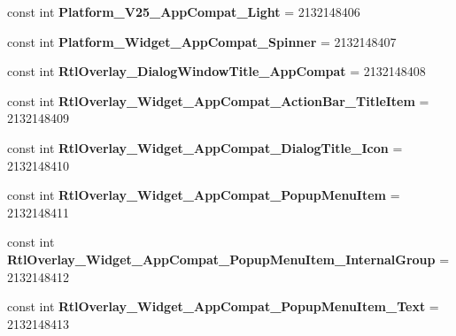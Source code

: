 \begin{DoxyCompactItemize}
const int {\bfseries Platform\+\_\+\+V25\+\_\+\+App\+Compat\+\_\+\+Light} = 2132148406
\item 
\mbox{\label{classst_delivery_1_1_resource_1_1_style_a5e16dbc8e26e392588f603287a7cfe24}} 
const int {\bfseries Platform\+\_\+\+Widget\+\_\+\+App\+Compat\+\_\+\+Spinner} = 2132148407
\item 
\mbox{\label{classst_delivery_1_1_resource_1_1_style_ae424e442f189c7aafae8f89eb0df77f6}} 
const int {\bfseries Rtl\+Overlay\+\_\+\+Dialog\+Window\+Title\+\_\+\+App\+Compat} = 2132148408
\item 
\mbox{\label{classst_delivery_1_1_resource_1_1_style_aab93a183f255bb31fed33515a840aed0}} 
const int {\bfseries Rtl\+Overlay\+\_\+\+Widget\+\_\+\+App\+Compat\+\_\+\+Action\+Bar\+\_\+\+Title\+Item} = 2132148409
\item 
\mbox{\label{classst_delivery_1_1_resource_1_1_style_ada602b0e60651a4bb10f8c519db69cd1}} 
const int {\bfseries Rtl\+Overlay\+\_\+\+Widget\+\_\+\+App\+Compat\+\_\+\+Dialog\+Title\+\_\+\+Icon} = 2132148410
\item 
\mbox{\label{classst_delivery_1_1_resource_1_1_style_ac3f228405fed77d8285d5f7f7c8c7120}} 
const int {\bfseries Rtl\+Overlay\+\_\+\+Widget\+\_\+\+App\+Compat\+\_\+\+Popup\+Menu\+Item} = 2132148411
\item 
\mbox{\label{classst_delivery_1_1_resource_1_1_style_a9027c21ef5e8007a18578a2be1c8a4b5}} 
const int {\bfseries Rtl\+Overlay\+\_\+\+Widget\+\_\+\+App\+Compat\+\_\+\+Popup\+Menu\+Item\+\_\+\+Internal\+Group} = 2132148412
\item 
\mbox{\label{classst_delivery_1_1_resource_1_1_style_aa24ca9e7f6b8d7496ca36bdf3fd88e6c}} 
const int {\bfseries Rtl\+Overlay\+\_\+\+Widget\+\_\+\+App\+Compat\+\_\+\+Popup\+Menu\+Item\+\_\+\+Text} = 2132148413
\item 
\mbox{\label{classst_delivery_1_1_resource_1_1_style_a24535b3f9e6095e472ccbbf510f5c1bf}} 

\end{DoxyCompactItemize}
